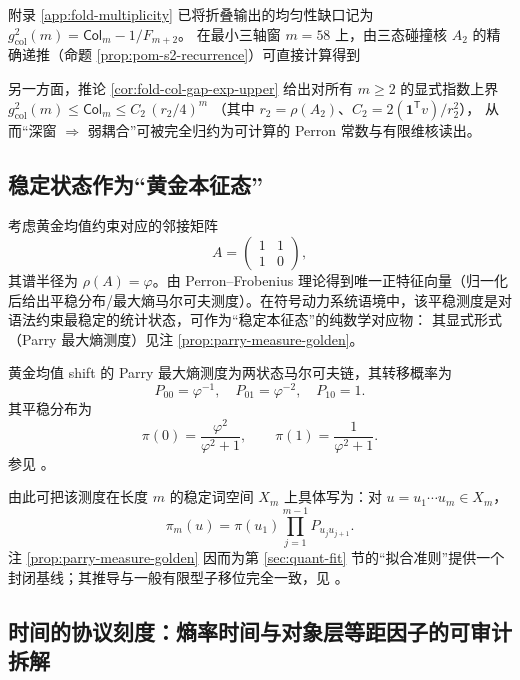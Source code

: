 \begin{remark}[三轴最小窗上的折叠碰撞耦合量级]\label{rem:gut-m58-collision-gap-scale}
附录 \ref{app:fold-multiplicity} 已将折叠输出的均匀性缺口记为 \(g_{\mathrm{col}}^2(m)=\mathsf{Col}_m-1/F_{m+2}\)。
在最小三轴窗 \(m=58\) 上，由三态碰撞核 \(A_2\) 的精确递推（命题 \ref{prop:pom-s2-recurrence}）可直接计算得到

\par
另一方面，推论 \ref{cor:fold-col-gap-exp-upper} 给出对所有 \(m\ge 2\) 的显式指数上界
\(
g_{\mathrm{col}}^2(m)\le \mathsf{Col}_m\le C_2\,(r_2/4)^m
\)
（其中 \(r_2=\rho(A_2)\)、\(C_2=2(\mathbf{1}^{\mathsf T}v)/r_2^2\)），
从而“深窗 \(\Rightarrow\) 弱耦合”可被完全归约为可计算的 Perron 常数与有限维核读出。
\end{remark}

\subsection{稳定状态作为“黄金本征态”}

考虑黄金均值约束对应的邻接矩阵
\[
A=\begin{pmatrix}
1 & 1\\
1 & 0
\end{pmatrix},
\]
其谱半径为 $\rho(A)=\varphi$。由 Perron--Frobenius 理论得到唯一正特征向量（归一化后给出平稳分布/最大熵马尔可夫测度）。在符号动力系统语境中，该平稳测度是对语法约束最稳定的统计状态，可作为“稳定本征态”的纯数学对应物：
其显式形式（Parry 最大熵测度）见注 \ref{prop:parry-measure-golden}。

\begin{remark}\label{prop:parry-measure-golden}
黄金均值 shift 的 Parry 最大熵测度为两状态马尔可夫链，其转移概率为
\[
P_{00}=\varphi^{-1},\quad P_{01}=\varphi^{-2},\quad P_{10}=1.
\]
其平稳分布为
\[
\pi(0)=\frac{\varphi^2}{\varphi^2+1},\qquad
\pi(1)=\frac{1}{\varphi^2+1}.
\]
参见 \cite{LindMarcus1995}。
\end{remark}

由此可把该测度在长度 $m$ 的稳定词空间 $X_m$ 上具体写为：对 $u=u_1\cdots u_m\in X_m$，
\[
\pi_m(u)=\pi(u_1)\prod_{j=1}^{m-1} P_{u_j u_{j+1}}.
\]
注 \ref{prop:parry-measure-golden} 因而为第 \ref{sec:quant-fit} 节的“拟合准则”提供一个封闭基线；其推导与一般有限型子移位完全一致，见 \cite{LindMarcus1995}。

\subsection{时间的协议刻度：熵率时间与对象层等距因子的可审计拆解}\label{subsec:time-protocol-entropy-vs-rotation}
